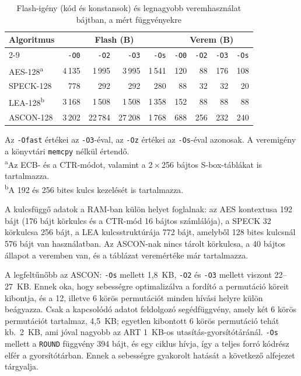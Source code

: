 \documentclass[a4paper,12pt]{report}
\theoremstyle{definition}
\theoremstyle{remark}
\begin{document}
\begin{table}[htbp]
    \centering
    \small
    \caption{Flash-igény (kód és konstansok) és legnagyobb veremhasználat bájtban, a mért függvényekre}
    \label{tab:memoria}
    \begin{tabular}{|l|r|r|r|r|r|r|r|r|}
        \hline
        \textbf{Algoritmus} & \multicolumn{4}{c|}{\textbf{Flash (B)}} & \multicolumn{4}{c|}{\textbf{Verem (B)}} \\ \cline{2-9}
        & \texttt{-O0} & \texttt{-O2} & \texttt{-O3} & \texttt{-Os} & \texttt{-O0} & \texttt{-O2} & \texttt{-O3} & \texttt{-Os} \\ \hline
        AES-128\textsuperscript{a} & 4\,135 & 1\,995 & 3\,995 & 1\,541 & 120 & 88 & 176 & 108 \\ \hline
        SPECK-128 & 778 & 292 & 292 & 280 & 88 & 32 & 32 & 20 \\ \hline
        LEA-128\textsuperscript{b} & 3\,168 & 1\,508 & 1\,508 & 1\,358 & 152 & 88 & 88 & 88 \\ \hline
        ASCON-128 & 3\,202 & 22\,784 & 27\,208 & 1\,768 & 688 & 256 & 232 & 240 \\ \hline
    \end{tabular}
    \begin{flushleft}
    \footnotesize
    Az \texttt{-Ofast} értékei az \texttt{-O3}-éval, az \texttt{-Oz} értékei az \texttt{-Os}-éval azonosak. A veremigény a könyvtári \texttt{memcpy} nélkül értendő.\\
    \textsuperscript{a}Az ECB- és a CTR-módot, valamint a 2\,$\times$\,256 bájtos S-box-táblákat is tartalmazza.\\
    \textsuperscript{b}A 192 és 256 bites kulcs kezelését is tartalmazza.
    \end{flushleft}
\end{table}

A kulcsfüggő adatok a RAM-ban külön helyet foglalnak: az AES kontextusa 192 bájt (176 bájt körkulcs és a CTR-mód 16 bájtos számlálója), a SPECK 32 körkulcsa 256 bájt, a LEA kulcsstruktúrája 772 bájt, amelyből 128 bites kulcsnál 576 bájt van használatban. Az ASCON-nak nincs tárolt körkulcsa, a 40 bájtos állapot a veremben van, és a táblázat veremértéke már tartalmazza.

A legfeltűnőbb az ASCON: \texttt{-Os} mellett 1,8~KB, \texttt{-O2} és \texttt{-O3} mellett viszont 22--27~KB. Ennek oka, hogy sebességre optimalizálva a fordító a permutáció köreit kibontja, és a 12, illetve 6 körös permutációt minden hívási helyre külön beágyazza. Csak a kapcsolódó adatot feldolgozó segédfüggvény, amely két 6 körös permutációt tartalmaz, 4,5~KB; egyetlen kibontott 6 körös permutáció tehát kb.\ 2~KB, ami jóval nagyobb az ART 1~KB-os utasítás-gyorsítótáránál. \texttt{-Os} mellett a \texttt{ROUND} függvény 394 bájt, és egy ciklus hívja, így a teljes forró kódrész elfér a gyorsítótárban. Ennek a sebességre gyakorolt hatását a következő alfejezet tárgyalja.
\end{document}
